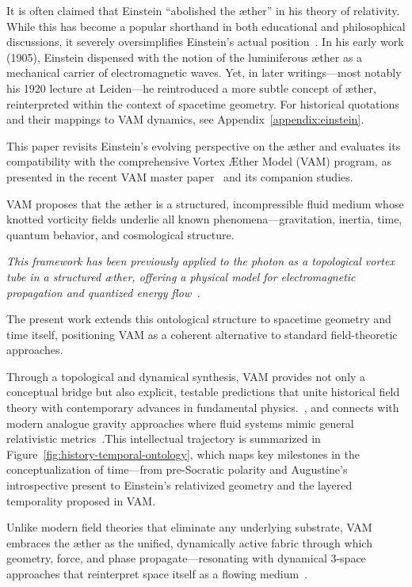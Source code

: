 It is often claimed that Einstein ``abolished the æther'' in his theory of relativity. While this has become a popular shorthand in both educational and philosophical discussions, it severely oversimplifies Einstein's actual position~\cite{einstein1920aether}. In his early work (1905), Einstein dispensed with the notion of the luminiferous æther as a mechanical carrier of electromagnetic waves. Yet, in later writings—most notably his 1920 lecture at Leiden—he reintroduced a more subtle concept of æther, reinterpreted within the context of spacetime geometry.
For historical quotations and their mappings to VAM dynamics, see Appendix~\ref{appendix:einstein}.


This paper revisits Einstein’s evolving perspective on the æther and evaluates its compatibility with the comprehensive Vortex Æther Model (VAM) program, as presented in the recent VAM master paper~\cite{VAM-8} and its companion studies.


VAM proposes that the æther is a structured, incompressible fluid medium whose knotted vorticity fields underlie all known phenomena—gravitation, inertia, time, quantum behavior, and cosmological structure.

\textit{This framework has been previously applied to the photon as a topological vortex tube in a structured æther, offering a physical model for electromagnetic propagation and quantized energy flow~\cite{VAM-17.1}.}

The present work extends this ontological structure to spacetime geometry and time itself, positioning VAM as a coherent alternative to standard field-theoretic approaches.

Through a topological and dynamical synthesis, VAM provides not only a conceptual bridge but also explicit, testable predictions that unite historical field theory with contemporary advances in fundamental physics.~\cite{VAM-11, VAM-15}, and connects with modern analogue gravity approaches where fluid systems mimic general relativistic metrics~\cite{barcelo2005}.This intellectual trajectory is summarized in Figure~\ref{fig:history-temporal-ontology}, which maps key milestones in the conceptualization of time—from pre-Socratic polarity and Augustine’s introspective present to Einstein’s relativized geometry and the layered temporality proposed in VAM.



Unlike modern field theories that eliminate any underlying substrate, VAM embraces the æther as the unified, dynamically active fabric through which geometry, force, and phase propagate—resonating with dynamical 3-space approaches that reinterpret space itself as a flowing medium~\cite{cahill2003dynamical}.

